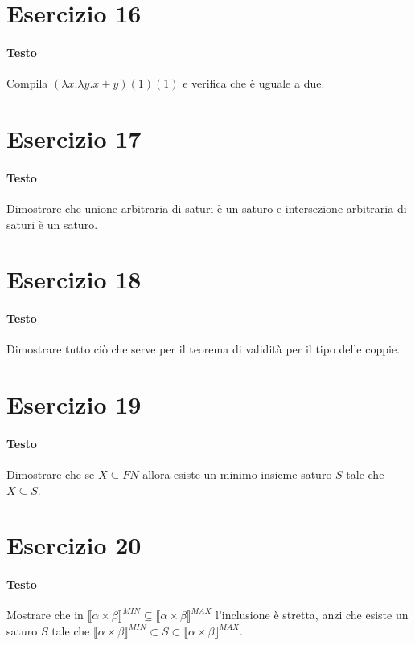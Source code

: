 \documentclass[a4paper,11pt]{article}
\begin{document}
\section*{Esercizio 16}
\paragraph{Testo}
Compila $(\lambda x.\lambda y. x+y)(1)(1)$ e verifica che è uguale a due.

\section*{Esercizio 17}
\paragraph{Testo}
Dimostrare che unione arbitraria di saturi è un saturo e intersezione arbitraria di saturi è un saturo.

\section*{Esercizio 18}
\paragraph{Testo}
Dimostrare tutto ciò che serve per il teorema di validità per il tipo delle coppie.

\section*{Esercizio 19}
\paragraph{Testo}
Dimostrare che se $X \subseteq F N$ allora esiste un minimo insieme saturo $S$ tale che $X \subseteq S$.

\section*{Esercizio 20}
\paragraph{Testo}
Mostrare che in $\llbracket \alpha \times \beta \rrbracket^{MIN} \subseteq \llbracket \alpha \times \beta \rrbracket^{MAX}$ l’inclusione è stretta, anzi che esiste un saturo $S$ tale che $\llbracket \alpha \times \beta \rrbracket^{MIN} \subset S \subset \llbracket \alpha \times \beta \rrbracket^{MAX}$.
\end{document}
